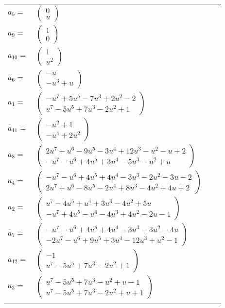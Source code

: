 \documentclass[1p]{elsarticle_modified}
\theoremstyle{definition}
\begin{document}
\begin{tabular}{m{7pt} m{180pt} m{7pt} m{180pt} }
\flushright $a_{5}=$&$\begin{pmatrix}0\\u\end{pmatrix}$ \\
\flushright $a_{9}=$&$\begin{pmatrix}1\\0\end{pmatrix}$ \\
\flushright $a_{10}=$&$\begin{pmatrix}1\\u^2\end{pmatrix}$ \\
\flushright $a_{6}=$&$\begin{pmatrix}- u\\- u^3+u\end{pmatrix}$ \\
\flushright $a_{1}=$&$\begin{pmatrix}- u^7+5 u^5-7 u^3+2 u^2-2\\u^7-5 u^5+7 u^3-2 u^2+1\end{pmatrix}$ \\
\flushright $a_{11}=$&$\begin{pmatrix}- u^2+1\\- u^4+2 u^2\end{pmatrix}$ \\
\flushright $a_{8}=$&$\begin{pmatrix}2 u^7+u^6-9 u^5-3 u^4+12 u^3- u^2- u+2\\- u^7- u^6+4 u^5+3 u^4-5 u^3- u^2+u\end{pmatrix}$ \\
\flushright $a_{4}=$&$\begin{pmatrix}- u^7- u^6+4 u^5+4 u^4-3 u^3-2 u^2-3 u-2\\2 u^7+u^6-8 u^5-2 u^4+8 u^3-4 u^2+4 u+2\end{pmatrix}$ \\
\flushright $a_{2}=$&$\begin{pmatrix}u^7-4 u^5+u^4+3 u^3-4 u^2+5 u\\- u^7+4 u^5- u^4-4 u^3+4 u^2-2 u-1\end{pmatrix}$ \\
\flushright $a_{7}=$&$\begin{pmatrix}- u^7- u^6+4 u^5+4 u^4-3 u^3-3 u^2-4 u\\-2 u^7- u^6+9 u^5+3 u^4-12 u^3+u^2-1\end{pmatrix}$ \\
\flushright $a_{12}=$&$\begin{pmatrix}-1\\u^7-5 u^5+7 u^3-2 u^2+1\end{pmatrix}$ \\
\flushright $a_{3}=$&$\begin{pmatrix}u^7-5 u^5+7 u^3- u^2+u-1\\u^7-5 u^5+7 u^3-2 u^2+u+1\end{pmatrix}$\\&\end{tabular}
\end{document}
